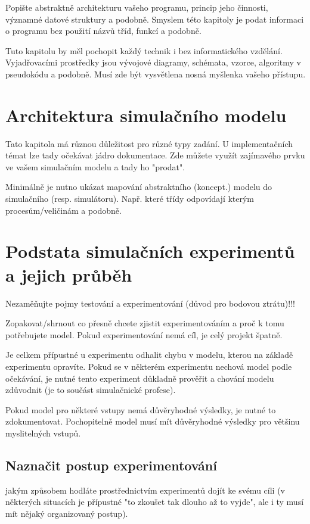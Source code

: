 \documentclass{scrartcl}
\begin{document}
Popište abstraktně architekturu vašeho programu, princip jeho činnosti, významné
datové struktury a podobně. Smyslem této kapitoly je podat informaci o programu
bez použití názvů tříd, funkcí a podobně.

Tuto kapitolu by měl pochopit každý technik i bez informatického
vzdělání. Vyjadřovacími prostředky jsou vývojové diagramy, schémata, vzorce,
algoritmy v pseudokódu a podobně. Musí zde být vysvětlena nosná myšlenka vašeho
přístupu.

\section{Architektura simulačního modelu}
\label{sec-4}
Tato kapitola má různou důležitost pro různé typy zadání. U implementačních
témat lze tady očekávat jádro dokumentace. Zde můžete využít zajímavého prvku ve
vašem simulačním modelu a tady ho "prodat".

Minimálně je nutno ukázat mapování abstraktního (koncept.) modelu do simulačního
(resp. simulátoru). Např. které třídy odpovídají kterým procesům/veličinám a
podobně.

\section{Podstata simulačních experimentů a jejich průběh}
\label{sec-5}
Nezaměňujte pojmy testování a experimentování (důvod pro bodovou ztrátu)!!!

Zopakovat/shrnout co přesně chcete zjistit experimentováním a proč k tomu
potřebujete model. Pokud experimentování nemá cíl, je celý projekt špatně.

Je celkem přípustné u experimentu odhalit chybu v modelu, kterou na základě
experimentu opravíte. Pokud se v některém experimentu nechová model podle
očekávání, je nutné tento experiment důkladně prověřit a chování modelu
zdůvodnit (je to součást simulačnické profese).

Pokud model pro některé vstupy nemá důvěryhodné výsledky, je nutné to
zdokumentovat. Pochopitelně model musí mít důvěryhodné výsledky pro většinu
myslitelných vstupů.

\subsection{Naznačit postup experimentování}
\label{sec-5-1}
jakým způsobem hodláte prostřednictvím experimentů dojít ke svému cíli (v
některých situacích je přípustné "to zkoušet tak dlouho až to vyjde", ale i ty
musí mít nějaký organizovaný postup).
\end{document}
